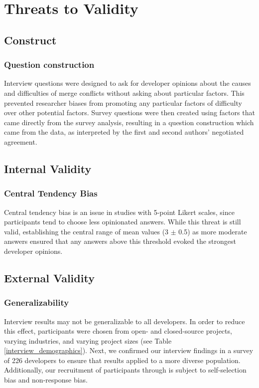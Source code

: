 \section{Threats to Validity}\label{threats}
\subsection{Construct}
\subsubsection{Question construction}
Interview questions were designed to ask for developer opinions about the causes and difficulties of merge conflicts without asking about particular factors. This prevented researcher biases from promoting any particular factors of difficulty over other potential factors. 
Survey questions were then created using factors that came directly from the survey analysis, resulting in a question construction which came from the data, as interpreted by the first and second authors' negotiated agreement.
\subsection{Internal Validity}
\subsubsection{Central Tendency Bias}
Central tendency bias \cite{guilford1954psychometric} is an issue in studies with 5-point Likert scales, since participants tend to choose less opinionated answers. While this threat is still valid, establishing the central range of mean values (3 $\pm$ 0.5) as more moderate answers ensured that any answers above this threshold evoked the strongest developer opinions.
\subsection{External Validity}
\subsubsection{Generalizability}
Interview results may not be generalizable to all developers. In order to reduce this effect, participants were chosen from open- and closed-source projects, varying industries, and varying project sizes (see Table \ref{interview_demographics}). Next, we confirmed our interview findings in a survey of 226 developers to ensure that results applied to a more diverse population. Additionally, our recruitment of participants through is subject to self-selection bias and non-response bias.


